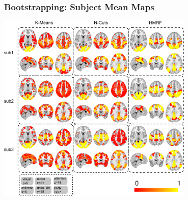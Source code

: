 \documentclass[sansserif, 10pt]{beamer}
\begin{document}

\begin{frame}
\frametitle{Bootstrapping: Subject Mean Maps}
\centering
\includegraphics[width = 0.7\textwidth]{sfig/submean}
\end{frame}
\end{document}
